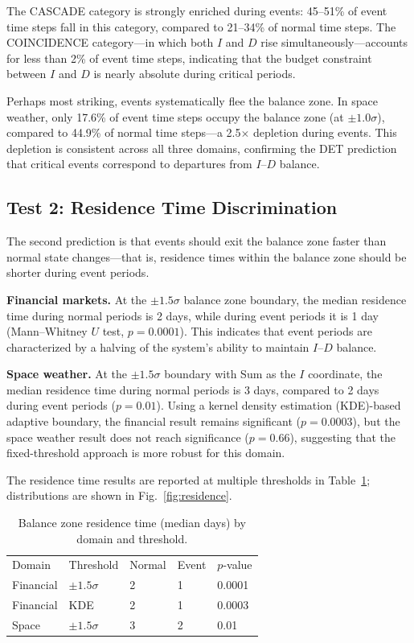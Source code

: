 \documentclass[aip,cha,reprint,amsmath,amssymb,final]{revtex4-2}
\begin{document}
The CASCADE category is strongly enriched during events: 45--51\% of event time steps fall in this category, compared to 21--34\% of normal time steps. The COINCIDENCE category---in which both $I$ and $D$ rise simultaneously---accounts for less than 2\% of event time steps, indicating that the budget constraint between $I$ and $D$ is nearly absolute during critical periods.

Perhaps most striking, events systematically flee the balance zone. In space weather, only 17.6\% of event time steps occupy the balance zone (at $\pm 1.0\sigma$), compared to 44.9\% of normal time steps---a 2.5$\times$ depletion during events. This depletion is consistent across all three domains, confirming the DET prediction that critical events correspond to departures from $I$--$D$ balance.

\subsection{Test 2: Residence Time Discrimination}

The second prediction is that events should exit the balance zone faster than normal state changes---that is, residence times within the balance zone should be shorter during event periods.

\textbf{Financial markets.} At the $\pm 1.5\sigma$ balance zone boundary, the median residence time during normal periods is 2 days, while during event periods it is 1 day (Mann--Whitney $U$ test, $p = 0.0001$). This indicates that event periods are characterized by a halving of the system's ability to maintain $I$--$D$ balance.

\textbf{Space weather.} At the $\pm 1.5\sigma$ boundary with Sum as the $I$ coordinate, the median residence time during normal periods is 3 days, compared to 2 days during event periods ($p = 0.01$). Using a kernel density estimation (KDE)-based adaptive boundary, the financial result remains significant ($p = 0.0003$), but the space weather result does not reach significance ($p = 0.66$), suggesting that the fixed-threshold approach is more robust for this domain.

The residence time results are reported at multiple thresholds in Table~\ref{tab:residence}; distributions are shown in Fig.~\ref{fig:residence}.

\begin{table}[!htbp]
\caption[Balance zone residence time in median days by domain and threshold]{\label{tab:residence}Balance zone residence time (median days) by domain and threshold.}
\begin{ruledtabular}
\begin{tabular}{lllll}
Domain & Threshold & Normal & Event & $p$-value \\
Financial & $\pm 1.5\sigma$ & 2 & 1 & 0.0001 \\
Financial & KDE & 2 & 1 & 0.0003 \\
Space & $\pm 1.5\sigma$ & 3 & 2 & 0.01 \\
\end{tabular}
\end{ruledtabular}
\end{table}
\end{document}
